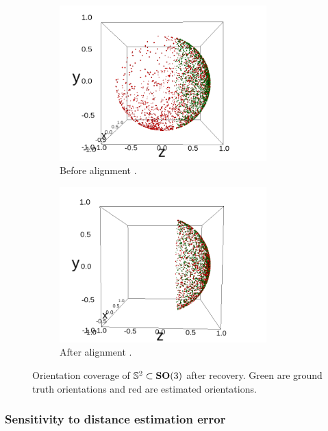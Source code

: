 \begin{figure}
    \centering
    \begin{subfigure}[b]{0.45\textwidth}
        \includegraphics[height=6cm]{images/coverage_alignment_before.png}
        \caption{Before alignment .}
    \end{subfigure}
    \hfill
    \begin{subfigure}[b]{0.50\textwidth}
    \centering
        \includegraphics[height=6cm]{images/coverage_alignment_after.png}
        \caption{After alignment .}
    \end{subfigure}
    \caption{
        Orientation coverage of $\mathbb{S}^2 \subset \mathrm{\mathbf{SO}}(3)$ after recovery.
        Green are ground truth orientations and red are estimated orientations.
}
    \label{fig:minim-loss-perfect-distances}
\end{figure}

\subsubsection{Sensitivity to distance estimation error}\label{sec:results:orientation-recovery:sensitivity}

